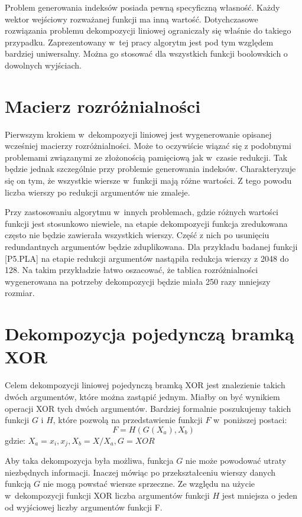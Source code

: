 Problem generowania indeksów posiada pewną specyficzną własność.
Każdy wektor wejściowy rozważanej funkcji ma inną wartość.
Dotychczasowe rozwiązania problemu dekompozycji liniowej ograniczały się właśnie do takiego przypadku.
Zaprezentowany w~tej pracy algorytm jest pod tym względem bardziej uniwersalny.
Można go stosować dla wszystkich funkcji boolowskich o dowolnych wyjściach.

\section{Macierz rozróżnialności}

Pierwszym krokiem w~dekompozycji liniowej jest wygenerowanie opisanej wcześniej macierzy rozróżnialności.
Może to oczywiście wiązać się z podobnymi problemami związanymi ze złożonością pamięciową jak w~czasie redukcji.
Tak będzie jednak szczególnie przy problemie generowania indeksów.
Charakteryzuje się on tym,
że wszystkie wiersze w~funkcji mają różne wartości.
Z tego powodu liczba wierszy po redukcji argumentów nie zmaleje.

Przy zastosowaniu algorytmu w~innych problemach,
gdzie różnych wartości funkcji jest stosunkowo niewiele,
na etapie dekompozycji funkcja zredukowana często nie będzie zawierała wszystkich wierszy.
Część z nich po usunięciu redundantnych argumentów będzie zduplikowana.
Dla przykładu badanej funkcji [P5.PLA] na etapie redukcji argumentów nastąpiła redukcja wierszy z 2048 do 128.
Na takim przykładzie łatwo oszacować,
że tablica rozróżnialności wygenerowana na potrzeby dekompozycji będzie miała 250 razy mniejszy rozmiar.

\section{Dekompozycja pojedynczą bramką XOR}

Celem dekompozycji liniowej pojedynczą bramką XOR jest znalezienie takich dwóch argumentów,
które można zastąpić jednym.
Miałby on być wynikiem operacji XOR tych dwóch argumentów.
Bardziej formalnie poszukujemy takich funkcji $G$ i $H$,
które pozwolą na przedstawienie funkcji $F$ w~poniższej postaci:
\begin{equation}
F = H( G ( X_a ), X_b)
\end{equation}
gdzie: $X_a = {x_i, x_j}, X_b = X / X_a, G = XOR$

Aby taka dekompozycja była możliwa,
funkcja $G$ nie może powodować utraty niezbędnych informacji.
Inaczej mówiąc po przekształceniu wierszy danych funkcją $G$ nie mogą powstać wiersze sprzeczne.
Ze względu na użycie w~dekompozycji funkcji XOR liczba argumentów funkcji $H$ jest mniejsza o jeden od wyjściowej liczby argumentów funkcji F.


